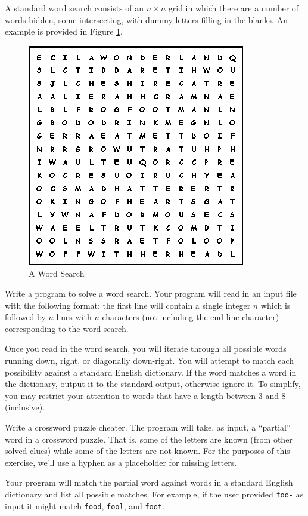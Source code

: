 \begin{exer}
A standard word search consists of an $n \times n$ grid in which there 
are a number of words hidden, some intersecting, with dummy letters 
filling in the blanks.  An example is provided in Figure \ref{fig:wordSearch}.

\begin{figure}[h]
\centering
\includegraphics[scale=0.50]{images/wordSearch}
\caption{A Word Search}
\label{fig:wordSearch}
\end{figure}

Write a program to solve a word search.  Your program will read in
an input file with the following format: the first line will contain a 
single integer $n$ which is followed by $n$ lines with $n$ characters 
(not including the end line character) corresponding to the word search.

Once you read in the word search, you will iterate through all possible 
words running down, right, or diagonally down-right.  You will attempt 
to match each possibility against a standard English dictionary.
If the word matches a word in the dictionary, output it to the standard 
output, otherwise ignore it.  To simplify, you may restrict your attention 
to words that have a length between 3 and 8 (inclusive).
\end{exer}

\begin{exer}
Write a crossword puzzle cheater.  The program will take, as input, 
a ``partial'' word in a crossword puzzle.  That is, some of the letters
are known (from other solved clues) while some of the letters are 
not known.  For the purposes of this exercise, we'll use a hyphen 
as a placeholder for missing letters.  

Your program will match the partial word against words in a standard
English dictionary and list all possible matches.  For example, if the 
user provided \texttt{foo-} as input it might match 
\texttt{food}, \texttt{fool}, and \texttt{foot}.  
\end{exer}

